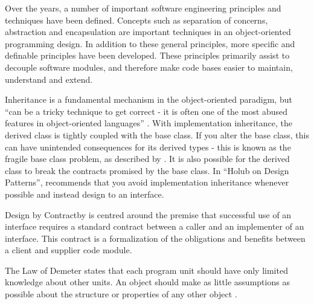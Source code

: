 Over the years, a number of important software engineering principles and techniques have been defined.  Concepts such as separation of concerns, abstraction and encapsulation are important techniques in an object-oriented programming design.  In addition to these general principles, more specific and definable principles have been developed. These principles primarily assist to decouple software modules, and therefore make code bases easier to maintain, understand and extend.

Inheritance is a fundamental mechanism in the object-oriented paradigm, but  ``can be a tricky technique to get correct - it is often one of the most abused features in object-oriented languages'' \citep{pugh06}. With implementation inheritance, the derived class is tightly coupled with the base class. If you alter the base class, this can have unintended consequences for its derived types - this is known as  the fragile base class problem, as described by \citet{mikhajlov98}. It is also possible for the derived class to break the contracts promised by the base class. In ``Holub on Design Patterns'', \citet{holub04} recommends that you avoid implementation inheritance whenever possible and instead design to an interface.

Design by Contract\texttrademark by \citet{meyer92} is centred around the premise that successful use of an interface requires a standard contract between a caller and an implementer of an interface. This contract is a formalization of the obligations and benefits between a client and supplier code module.  

The Law of Demeter states that each program unit should have only limited knowledge about other units. An object should make as little assumptions as possible about the structure or properties of any other object \citep{lieberherr96}.

